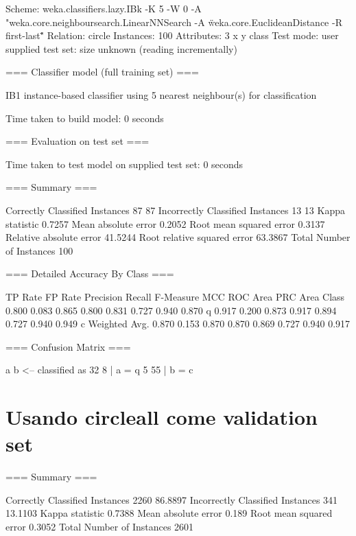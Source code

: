 \documentclass{report}
\begin{document}
	Scheme:       weka.classifiers.lazy.IBk -K 5 -W 0 -A "weka.core.neighboursearch.LinearNNSearch -A \"weka.core.EuclideanDistance -R first-last\""
	Relation:     circle
	Instances:    100
	Attributes:   3
	x
	y
	class
	Test mode:    user supplied test set:  size unknown (reading incrementally)
	
	=== Classifier model (full training set) ===
	
	IB1 instance-based classifier
	using 5 nearest neighbour(s) for classification
	
	
	Time taken to build model: 0 seconds
	
	=== Evaluation on test set ===
	
	Time taken to test model on supplied test set: 0 seconds
	
	=== Summary ===
	
	Correctly Classified Instances          87               87      %
	Incorrectly Classified Instances        13               13      %
	Kappa statistic                          0.7257
	Mean absolute error                      0.2052
	Root mean squared error                  0.3137
	Relative absolute error                 41.5244 %
	Root relative squared error             63.3867 %
	Total Number of Instances              100     
	
	=== Detailed Accuracy By Class ===
	
	TP Rate  FP Rate  Precision  Recall   F-Measure  MCC      ROC Area  PRC Area  Class
	0.800    0.083    0.865      0.800    0.831      0.727    0.940     0.870     q
	0.917    0.200    0.873      0.917    0.894      0.727    0.940     0.949     c
	Weighted Avg.    0.870    0.153    0.870      0.870    0.869      0.727    0.940     0.917     
	
	=== Confusion Matrix ===
	
	a  b   <-- classified as
	32  8 |  a = q
	5 55 |  b = c
	
	\section{Usando circleall come validation set}
	=== Summary ===
	
	Correctly Classified Instances        2260               86.8897 %
	Incorrectly Classified Instances       341               13.1103 %
	Kappa statistic                          0.7388
	Mean absolute error                      0.189 
	Root mean squared error                  0.3052
	Total Number of Instances             2601     
	
\end{document}
